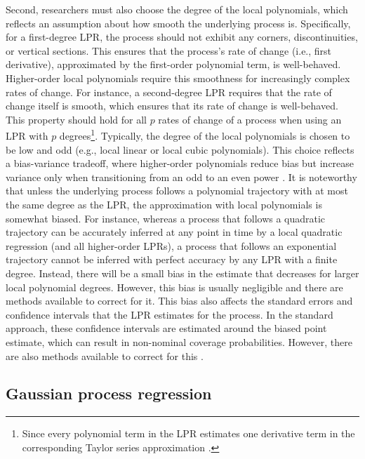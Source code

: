 \documentclass[man, floatsintext]{apa7}
\begin{document}
Second, researchers must also choose the degree of the local polynomials, which
reflects an assumption about how smooth the underlying process is.
Specifically, for a first-degree LPR, the process should not exhibit any
corners, discontinuities, or vertical sections. This ensures that the process's
rate of change (i.e., first derivative), approximated by the first-order
polynomial term, is well-behaved. Higher-order local polynomials require this
smoothness for increasingly complex rates of change. For instance, a
second-degree LPR requires that the rate of change itself is smooth, which
ensures that its rate of change is well-behaved. This property should hold for
all $p$ rates of change of a process when using an LPR with $p$
degrees\footnote{Since every polynomial term in the LPR estimates one
  derivative term in the corresponding Taylor series approximation
  \parencite{avery_literature_nodate}.}. Typically, the degree of the local
polynomials is chosen to be low and odd (e.g., local linear or local cubic
polynomials). This choice reflects a bias-variance tradeoff, where higher-order
polynomials reduce bias but increase variance only when transitioning from an
odd to an even power \parencite{ruppert_multivariate_1994}. It is noteworthy
that unless the underlying process follows a polynomial trajectory with at most
the same degree as the LPR, the approximation with local polynomials is
somewhat biased. For instance, whereas a process that follows a quadratic
trajectory can be accurately inferred at any point in time by a local quadratic
regression (and all higher-order LPRs), a process that follows an exponential
trajectory cannot be inferred with perfect accuracy by any LPR with a finite
degree. Instead, there will be a small bias in the estimate that decreases for
larger local polynomial degrees. However, this bias is usually negligible and
there are methods available to correct for it. This bias also affects the
standard errors and confidence intervals that the LPR estimates for the
process. In the standard approach, these confidence intervals are estimated
around the biased point estimate, which can result in non-nominal coverage
probabilities. However, there are also methods available to correct for this
\parencite{R-nprobust}.

\subsection{Gaussian process regression}
\end{document}
